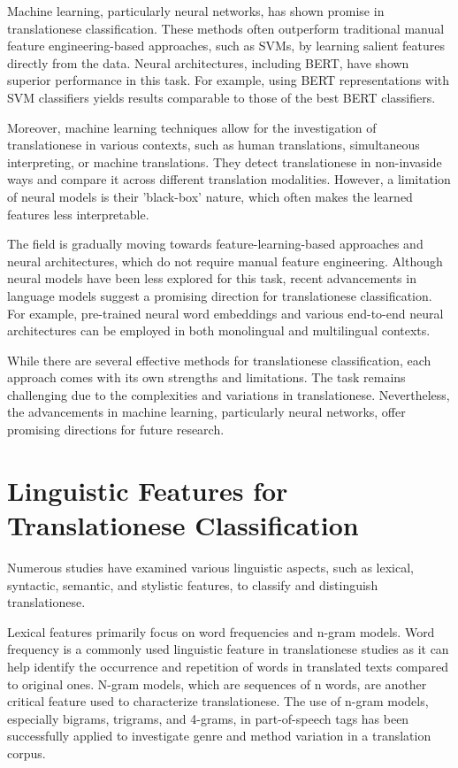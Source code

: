 Machine learning, particularly neural networks, has shown promise in translationese classification. These methods often outperform traditional manual feature engineering-based approaches, such as SVMs, by learning salient features directly from the data. Neural architectures, including BERT, have shown superior performance in this task. For example, using BERT representations with SVM classifiers yields results comparable to those of the best BERT classifiers.

Moreover, machine learning techniques allow for the investigation of translationese in various contexts, such as human translations, simultaneous interpreting, or machine translations. They detect translationese in non-invaside ways and compare it across different translation modalities. However, a limitation of neural models is their 'black-box' nature, which often makes the learned features less interpretable.

The field is gradually moving towards feature-learning-based approaches and neural architectures, which do not require manual feature engineering. Although neural models have been less explored for this task, recent advancements in language models suggest a promising direction for translationese classification. For example, pre-trained neural word embeddings and various end-to-end neural architectures can be employed in both monolingual and multilingual contexts.

While there are several effective methods for translationese classification, each approach comes with its own strengths and limitations. The task remains challenging due to the complexities and variations in translationese. Nevertheless, the advancements in machine learning, particularly neural networks, offer promising directions for future research.


\section{Linguistic Features for Translationese Classification}

Numerous studies have examined various linguistic aspects, such as lexical, syntactic, semantic, and stylistic features, to classify and distinguish translationese.

Lexical features primarily focus on word frequencies and n-gram models. Word frequency is a commonly used linguistic feature in translationese studies as it can help identify the occurrence and repetition of words in translated texts compared to original ones. N-gram models, which are sequences of n words, are another critical feature used to characterize translationese. The use of n-gram models, especially bigrams, trigrams, and 4-grams, in part-of-speech tags has been successfully applied to investigate genre and method variation in a translation corpus.

